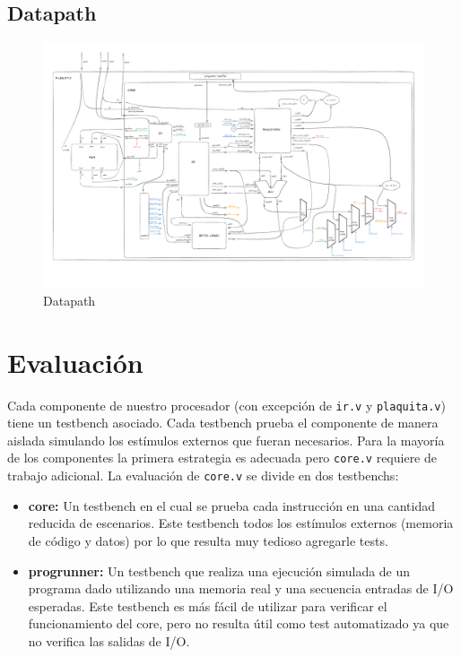 \documentclass{article}
\begin{document}
\subsection{Datapath}

\begin{figure}
    \centering
    \includegraphics[width=20cm,angle=90]{datapath.pdf}
    \caption{Datapath}
\end{figure}

\newpage

\section{Evaluación}
Cada componente de nuestro procesador (con excepción de \texttt{ir.v} y \texttt{plaquita.v}) tiene un testbench asociado. Cada testbench prueba el componente de manera aislada simulando los estímulos externos que fueran necesarios.
Para la mayoría de los componentes la primera estrategia es adecuada pero \texttt{core.v} requiere de trabajo adicional. La evaluación de \texttt{core.v} se divide en dos testbenchs:
\begin{itemize}
    \item \textbf{core:} Un testbench en el cual se prueba cada instrucción en una cantidad reducida de escenarios. Este testbench todos los estímulos externos (memoria de código y datos) por lo que resulta muy tedioso agregarle tests.
    \item \textbf{progrunner:} Un testbench que realiza una ejecución simulada de un programa dado utilizando una memoria real y una secuencia entradas de I/O esperadas. Este testbench es más fácil de utilizar para verificar el funcionamiento del core, pero no resulta útil como test automatizado ya que no verifica las salidas de I/O.
\end{itemize}
\end{document}
